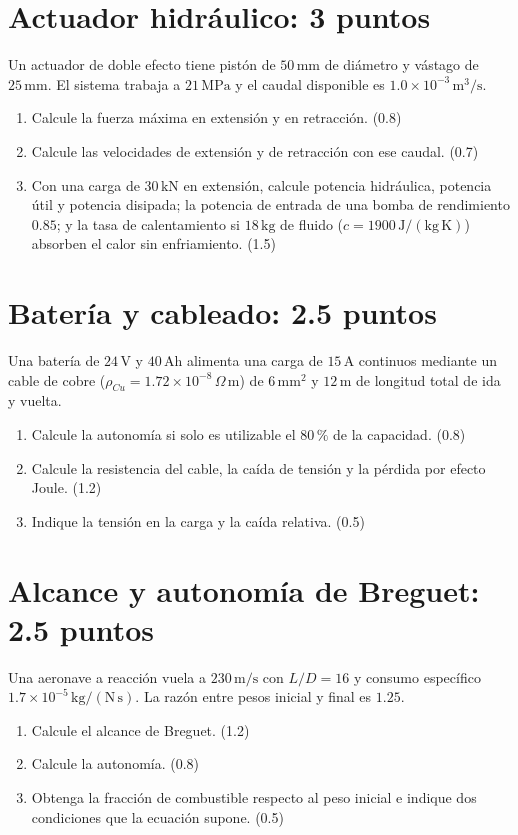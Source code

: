 \section{Actuador hidráulico: 3 puntos}
Un actuador de doble efecto tiene pistón de $50\,\mathrm{mm}$ de diámetro y vástago de $25\,\mathrm{mm}$. El sistema trabaja a $21\,\mathrm{MPa}$ y el caudal disponible es $1.0\times10^{-3}\,\mathrm{m^3/s}$.
\begin{enumerate}[label=\alph*)]
\item Calcule la fuerza máxima en extensión y en retracción. (0.8)
\item Calcule las velocidades de extensión y de retracción con ese caudal. (0.7)
\item Con una carga de $30\,\mathrm{kN}$ en extensión, calcule potencia hidráulica, potencia útil y potencia disipada; la potencia de entrada de una bomba de rendimiento $0.85$; y la tasa de calentamiento si $18\,\mathrm{kg}$ de fluido ($c=1900\,\mathrm{J/(kg\,K)}$) absorben el calor sin enfriamiento. (1.5)
\end{enumerate}
\section{Batería y cableado: 2.5 puntos}
Una batería de $24\,\mathrm V$ y $40\,\mathrm{Ah}$ alimenta una carga de $15\,\mathrm A$ continuos mediante un cable de cobre ($\rho_{Cu}=1.72\times10^{-8}\,\Omega\,\mathrm m$) de $6\,\mathrm{mm^2}$ y $12\,\mathrm m$ de longitud total de ida y vuelta.
\begin{enumerate}[label=\alph*)]
\item Calcule la autonomía si solo es utilizable el $80\,\%$ de la capacidad. (0.8)
\item Calcule la resistencia del cable, la caída de tensión y la pérdida por efecto Joule. (1.2)
\item Indique la tensión en la carga y la caída relativa. (0.5)
\end{enumerate}
\section{Alcance y autonomía de Breguet: 2.5 puntos}
Una aeronave a reacción vuela a $230\,\mathrm{m/s}$ con $L/D=16$ y consumo específico $1.7\times10^{-5}\,\mathrm{kg/(N\,s)}$. La razón entre pesos inicial y final es $1.25$.
\begin{enumerate}[label=\alph*)]
\item Calcule el alcance de Breguet. (1.2)
\item Calcule la autonomía. (0.8)
\item Obtenga la fracción de combustible respecto al peso inicial e indique dos condiciones que la ecuación supone. (0.5)
\end{enumerate}
